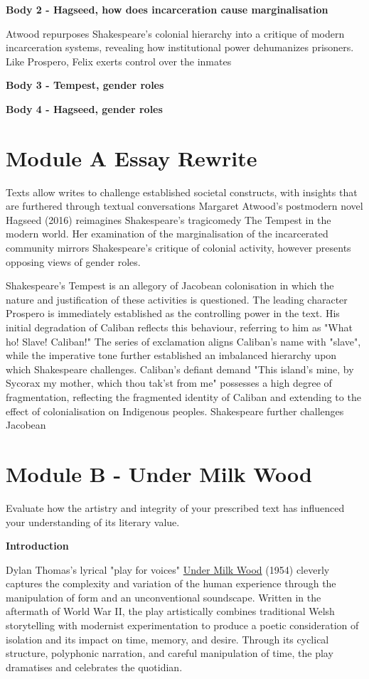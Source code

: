 	\textbf{Body 2 - Hagseed, how does incarceration cause marginalisation}

	Atwood repurposes Shakespeare’s colonial hierarchy into a critique of modern incarceration systems, revealing how institutional power dehumanizes prisoners. Like Prospero, Felix exerts control over the inmates 

	\textbf{Body 3 - Tempest, gender roles}
	
	\textbf{Body 4 - Hagseed, gender roles}



\section{Module A Essay Rewrite}
	
	Texts allow writes to challenge established societal constructs, with insights that are furthered through textual conversations Margaret Atwood's postmodern novel Hagseed (2016) reimagines Shakespeare's tragicomedy The Tempest in the modern world. Her examination of the marginalisation of the incarcerated community mirrors Shakespeare's critique of colonial activity, however presents opposing views of gender roles.

	Shakespeare's Tempest is an allegory of Jacobean colonisation in which the nature and justification of these activities is questioned. The leading character Prospero is immediately established as the controlling power in the text. His initial degradation of Caliban reflects this behaviour, referring to him as "What ho! Slave! Caliban!" The series of exclamation aligns Caliban's name with "slave", while the imperative tone further established an imbalanced hierarchy upon which Shakespeare challenges. Caliban's defiant demand "This island's mine, by Sycorax my mother, which thou tak'st from me" possesses a high degree of fragmentation, reflecting the fragmented identity of Caliban and extending to the effect of colonialisation on Indigenous peoples. Shakespeare further challenges Jacobean

\section{Module B - Under Milk Wood}

	Evaluate how the artistry and integrity of your prescribed text has influenced your understanding of its literary value.

	\textbf{Introduction}

		Dylan Thomas's lyrical "play for voices" \underline{Under Milk Wood} (1954) cleverly captures the complexity and variation of the human experience through the manipulation of form and an unconventional soundscape. Written in the aftermath of World War II, the play artistically combines traditional Welsh storytelling with modernist experimentation to produce a poetic consideration of isolation and its impact on time, memory, and desire. Through its cyclical structure, polyphonic narration, and careful manipulation of time, the play dramatises and celebrates the quotidian.
	
